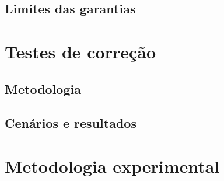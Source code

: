 \subsection{Limites das garantias}

\section{Testes de correção}

\subsection{Metodologia}

\subsection{Cenários e resultados}

\section{Metodologia experimental}


